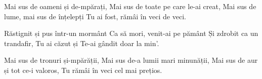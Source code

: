 \beginverse
Mai sus de oameni și de-mpărați,
Mai sus de toate pe care le-ai creat,
Mai sus de lume, mai sus de înțelepți
Tu ai fost, rămâi în veci de veci.
\endverse

\beginchorus
Răstignit și pus într-un mormânt
Ca să mori, venit-ai pe pământ
Și zdrobit ca un trandafir,
Tu ai căzut și Te-ai gândit doar la min'.
\endchorus

\beginverse
Mai sus de tronuri și-mpărății,
Mai sus de-a lumii mari minunății,
Mai sus de aur și tot ce-i valoros,
Tu rămâi în veci cel mai prețios.
\endverse
\endsong